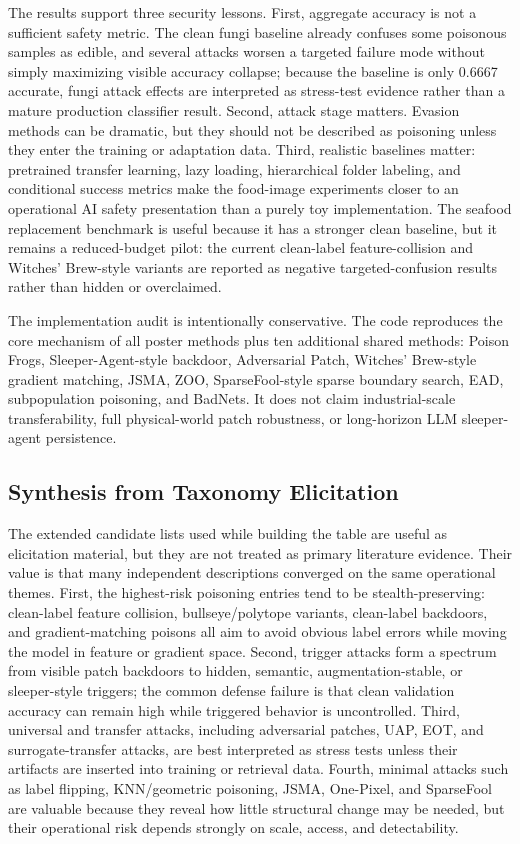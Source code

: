 \documentclass[conference]{IEEEtran}
\begin{document}
The results support three security lessons. First, aggregate accuracy is not a sufficient safety metric. The clean fungi baseline already confuses some poisonous samples as edible, and several attacks worsen a targeted failure mode without simply maximizing visible accuracy collapse; because the baseline is only 0.6667 accurate, fungi attack effects are interpreted as stress-test evidence rather than a mature production classifier result. Second, attack stage matters. Evasion methods can be dramatic, but they should not be described as poisoning unless they enter the training or adaptation data. Third, realistic baselines matter: pretrained transfer learning, lazy loading, hierarchical folder labeling, and conditional success metrics make the food-image experiments closer to an operational AI safety presentation than a purely toy implementation. The seafood replacement benchmark is useful because it has a stronger clean baseline, but it remains a reduced-budget pilot: the current clean-label feature-collision and Witches' Brew-style variants are reported as negative targeted-confusion results rather than hidden or overclaimed.

The implementation audit is intentionally conservative. The code reproduces the core mechanism of all poster methods plus ten additional shared methods: Poison Frogs, Sleeper-Agent-style backdoor, Adversarial Patch, Witches' Brew-style gradient matching, JSMA, ZOO, SparseFool-style sparse boundary search, EAD, subpopulation poisoning, and BadNets. It does not claim industrial-scale transferability, full physical-world patch robustness, or long-horizon LLM sleeper-agent persistence.

\subsection{Synthesis from Taxonomy Elicitation}

The extended candidate lists used while building the table are useful as elicitation material, but they are not treated as primary literature evidence. Their value is that many independent descriptions converged on the same operational themes. First, the highest-risk poisoning entries tend to be stealth-preserving: clean-label feature collision, bullseye/polytope variants, clean-label backdoors, and gradient-matching poisons all aim to avoid obvious label errors while moving the model in feature or gradient space. Second, trigger attacks form a spectrum from visible patch backdoors to hidden, semantic, augmentation-stable, or sleeper-style triggers; the common defense failure is that clean validation accuracy can remain high while triggered behavior is uncontrolled. Third, universal and transfer attacks, including adversarial patches, UAP, EOT, and surrogate-transfer attacks, are best interpreted as stress tests unless their artifacts are inserted into training or retrieval data. Fourth, minimal attacks such as label flipping, KNN/geometric poisoning, JSMA, One-Pixel, and SparseFool are valuable because they reveal how little structural change may be needed, but their operational risk depends strongly on scale, access, and detectability.
\end{document}
